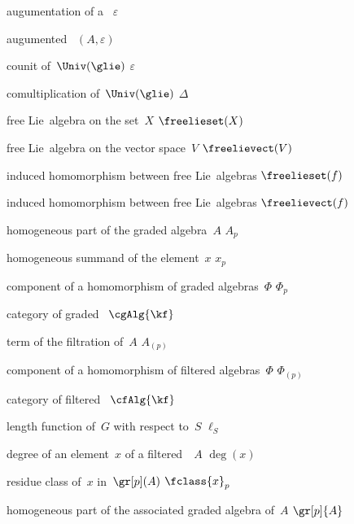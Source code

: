 {augumentation of a~\algebra{$\kf$}}
{$\varepsilon$}

{augumented~\algebra{$\kf$}}
{$(A, \varepsilon)$}

{counit of~$\Univ(\glie)$}
{$\varepsilon$}

{comultiplication of~$\Univ(\glie)$}
{$\Delta$}

{free Lie~algebra on the set~$X$}
{$\freelieset(X)$}

{free Lie~algebra on the vector space~$V$}
{$\freelievect(V)$}

{induced homomorphism between free Lie~algebras}
{$\freelieset(f)$}

{induced homomorphism between free Lie~algebras}
{$\freelievect(f)$}

{ homogeneous part of the graded algebra~$A$}
{$A_p$}

{ homogeneous summand of the element~$x$}
{$x_p$}

{ component of a homomorphism of graded algebras~$\Phi$}
{$\Phi_p$}

{category of graded~\algebras{$\kf$}}
{$\cgAlg{\kf}$}

{ term of the filtration of~$A$}
{$A_{(p)}$}

{ component of a homomorphism of filtered algebras~$\Phi$}
{$\Phi_{(p)}$}

{category of filtered~\algebras{$\kf$}}
{$\cfAlg{\kf}$}

{length function of~$G$ with respect to~$S$}
{$\ell_S$}

{degree of an element~$x$ of a filtered~\algebra{$\kf$}~$A$}
{$\deg(x)$}

{residue class of~$x$ in~$\gr[p](A)$}
{$\fclass{x}_p$}

{ homogeneous part of the associated graded algebra of~$A$}
{$\gr[p]{A}$}


